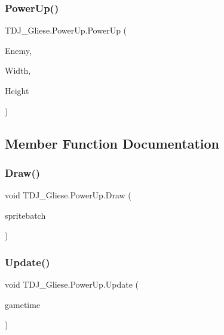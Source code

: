 \subsubsection{\texorpdfstring{Power\+Up()}{PowerUp()}}
{\footnotesize\ttfamily T\+D\+J\+\_\+\+Gliese.\+Power\+Up.\+Power\+Up (\begin{DoxyParamCaption}\item[{Texture2D}]{Enemy,  }\item[{int}]{Width,  }\item[{int}]{Height }\end{DoxyParamCaption})}



\subsection{Member Function Documentation}
\mbox{\label{class_t_d_j___gliese_1_1_power_up_ac46db01ba96c843eeeabfa649bd09c12}} 
\subsubsection{\texorpdfstring{Draw()}{Draw()}}
{\footnotesize\ttfamily void T\+D\+J\+\_\+\+Gliese.\+Power\+Up.\+Draw (\begin{DoxyParamCaption}\item[{Sprite\+Batch}]{spritebatch }\end{DoxyParamCaption})}

\mbox{\label{class_t_d_j___gliese_1_1_power_up_a2b15d72dcb58cbc354e386664b7bc8e0}} 
\subsubsection{\texorpdfstring{Update()}{Update()}}
{\footnotesize\ttfamily void T\+D\+J\+\_\+\+Gliese.\+Power\+Up.\+Update (\begin{DoxyParamCaption}\item[{Game\+Time}]{gametime }\end{DoxyParamCaption})}



